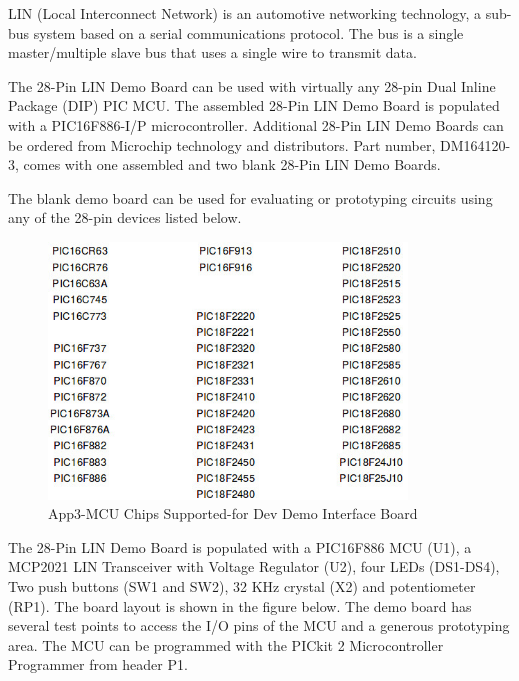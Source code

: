 LIN (Local Interconnect Network) is an automotive networking technology, a sub-bus system based on a serial communications protocol. The bus is a single master/multiple slave bus that uses a single wire to transmit data.
\vspace{0.5cm}

The 28-Pin LIN Demo Board can be used with virtually any 28-pin Dual Inline Package (DIP) PIC MCU. The assembled 28-Pin LIN Demo Board is populated with a PIC16F886-I/P microcontroller. Additional 28-Pin LIN Demo Boards can be ordered from Microchip technology and distributors. Part number, DM164120-3, comes with one assembled and two blank 28-Pin LIN Demo Boards. 
\vspace{0.5cm}

The blank demo board can be used for evaluating or prototyping circuits using any of the 28-pin devices listed below.

\begin{figure}[htbp]
	\begin{center}
		\includegraphics[width=0.85\textwidth]{./07-images/img-Ch3App/MCU-Chips-Supported-for-Dev-Demo-Board.jpg}
		\caption{App3-MCU Chips Supported-for Dev Demo Interface Board}
		\label{fig:App3-MCU-Chips-Supported-for-Dev-Demo-Board.jpg}
	\end{center}
\end{figure}

The 28-Pin LIN Demo Board is populated with a PIC16F886 MCU (U1), a MCP2021 LIN Transceiver with Voltage Regulator (U2), four LEDs (DS1-DS4), Two push buttons (SW1 and SW2), 32 KHz crystal (X2) and potentiometer (RP1). The board layout is shown in the figure below. The demo board has several test points to access the I/O pins of the MCU and a generous prototyping area. The MCU can be programmed with the PICkit 2 Microcontroller Programmer from header P1.
\vspace{0.5cm}

